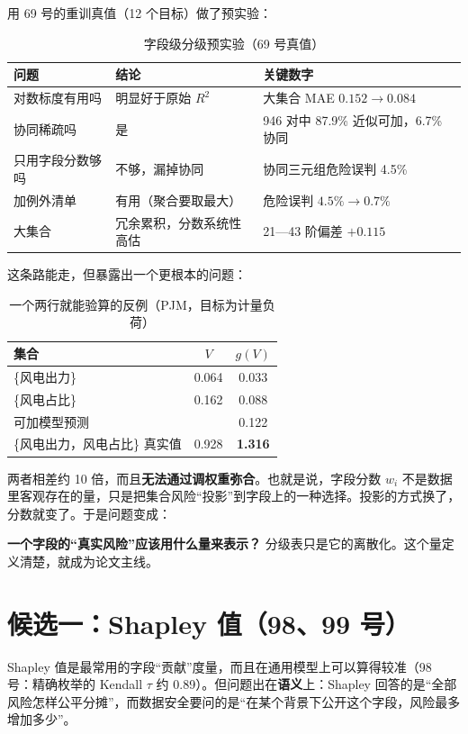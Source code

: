 \documentclass[zihao=-4,a4paper]{ctexart}
\begin{document}
用 69 号的重训真值（12 个目标）做了预实验：

\begin{table}[H]\centering
\caption{字段级分级预实验（69 号真值）}
\small
\begin{tabular}{lll}
\toprule
问题 & 结论 & 关键数字 \\
\midrule
对数标度有用吗 & 明显好于原始 $R^2$ & 大集合 MAE $0.152\to0.084$ \\
协同稀疏吗 & 是 & 946 对中 87.9\% 近似可加，6.7\% 协同 \\
只用字段分数够吗 & 不够，漏掉协同 & 协同三元组危险误判 4.5\% \\
加例外清单 & 有用（聚合要取最大） & 危险误判 $4.5\%\to0.7\%$ \\
大集合 & 冗余累积，分数系统性高估 & 21—43 阶偏差 $+0.115$ \\
\bottomrule
\end{tabular}
\end{table}

这条路能走，但暴露出一个更根本的问题：

\begin{table}[H]\centering
\caption{一个两行就能验算的反例（PJM，目标为计量负荷）}
\begin{tabular}{lcc}
\toprule
集合 & $V$ & $g(V)$ \\
\midrule
\{风电出力\} & 0.064 & 0.033 \\
\{风电占比\} & 0.162 & 0.088 \\
可加模型预测 & & 0.122 \\
\{风电出力，风电占比\} 真实值 & 0.928 & \textbf{1.316} \\
\bottomrule
\end{tabular}
\end{table}

两者相差约 10 倍，而且\textbf{无法通过调权重弥合}。也就是说，字段分数 $w_i$ 不是数据里客观存在的量，只是把集合风险“投影”到字段上的一种选择。投影的方式换了，分数就变了。于是问题变成：

\begin{notebox}
\textbf{一个字段的“真实风险”应该用什么量来表示？} 分级表只是它的离散化。这个量定义清楚，就成为论文主线。
\end{notebox}

\section{候选一：Shapley 值（98、99 号）}

Shapley 值是最常用的字段“贡献”度量，而且在通用模型上可以算得较准（98 号：精确枚举的 Kendall $\tau$ 约 0.89）。但问题出在\textbf{语义}上：Shapley 回答的是“全部风险怎样公平分摊”，而数据安全要问的是“在某个背景下公开这个字段，风险最多增加多少”。
\end{document}
